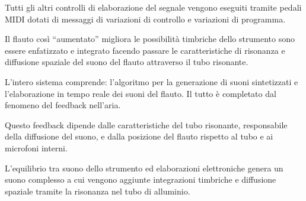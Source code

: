 Tutti gli altri controlli di elaborazione del segnale vengono eseguiti tramite
pedali MIDI dotati di messaggi di variazioni di controllo e variazioni di programma.

Il flauto così “aumentato” migliora le possibilità timbriche dello strumento sono
essere enfatizzato e integrato facendo passare le caratteristiche di risonanza e
diffusione spaziale del suono del flauto attraverso il tubo risonante.

L'intero sistema comprende: l'algoritmo per la generazione di suoni sintetizzati
e l’elaborazione in tempo reale dei suoni del flauto.
Il tutto è completato dal fenomeno del feedback nell'aria.

Questo feedback dipende dalle caratteristiche del tubo risonante, responsabile
della diffusione del suono,
e dalla posizione del flauto rispetto al tubo e ai microfoni interni.

L’equilibrio tra suono dello strumento ed elaborazioni elettroniche genera un
suono complesso a cui  vengono aggiunte integrazioni timbriche e diffusione
spaziale tramite la risonanza nel tubo di alluminio.
